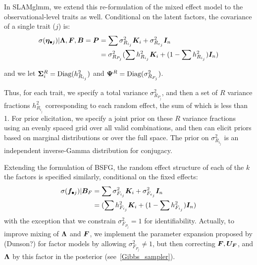 \documentclass[11pt]{amsart}
\newcommand*{\B}[1]{\ifmmode\bm{#1}\else\textbf{#1}\fi}
\begin{document}

In SLAMglmm, we extend this re-formulation of the mixed effect model to the observational-level traits as well. Conditional on the latent factors, the covariance of a single trait ($j$) is:
\begin{align} \begin{split}
\sigma(\B{\eta}_{\bullet j}) | \B{\Lambda}, \B{F}, \B{B} = \B{P} &= \sum \sigma^2_{R_{i_j}} \B{K}_i + \sigma^2_{R_{e_j}}\B{I}_n \\
&= \sigma^2_{R_{P_j}} (\sum h^2_{R_{i_j}} \B{K}_i + (1 - \sum h^2_{R_{i_j}})\B{I}_n) 
\end{split} \end{align}

\noindent and we let $\B{\Sigma}^R_i = \mbox{Diag}(h^2_{R_{i_j}})$ and $\B{\Psi}^R = \mbox{Diag}(\sigma^2_{R_{P_j}})$.

Thus, for each trait, we specify a total variance $\sigma^2_{R_{P_j}}$, and then a set of $R$ variance fractions $h^2_{R_{i_j}}$ corresponding to each random effect, the sum of which is less than 1. For prior elicitation, we specify a joint prior on these $R$ variance fractions using an evenly spaced grid over all valid combinations, and then can elicit priors based on marginal distributions or over the full space. The prior on $\sigma^2_{R_{i_j}}$ is an independent inverse-Gamma distribution for conjugacy. 

Extending the formulation of BSFG, the random effect structure of each of the $k$ the factors is specified similarly, conditional on the fixed effects:
\begin{align} \begin{split}
\sigma(\B{f}_{\bullet j} ) | \B{B}_F &= \sum \sigma^2_{F_{i_j}} \B{K}_i + \sigma^2_{F_{e_j}}\B{I}_n \\
&= (\sum h^2_{F_{i_j}} \B{K}_i + (1 - \sum h^2_{F_{i_j}})\B{I}_n) 
\end{split} \end{align}
\noindent with the exception that we constrain $\sigma^2_{F_{P_j}} = 1$ for identifiability. Actually, to improve mixing of $\B{\Lambda}$ and $\B{F}$, we implement the parameter expansion proposed by (Dunson?) for factor models by allowing $\sigma^2_{F_{P_j}} \neq1$, but then correcting $\B{F}, \B{U_F}$, and $\B{\Lambda}$ by this factor in the posterior (see~\ref{Gibbs_sampler}).
\end{document}
